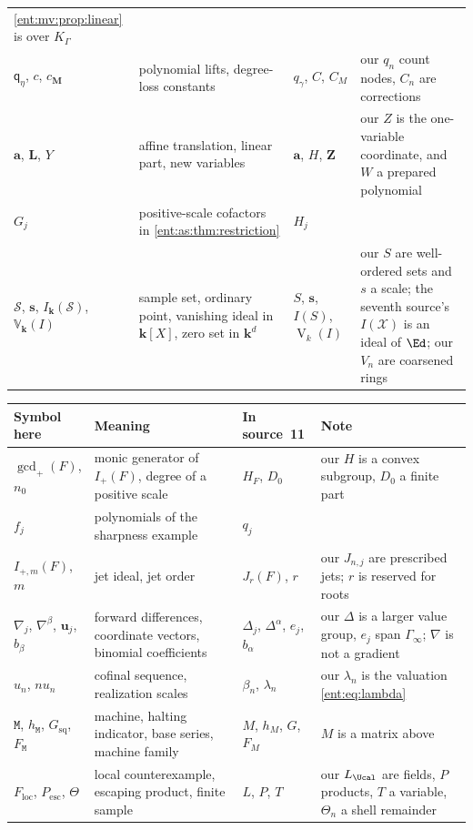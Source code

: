 \documentclass[11pt]{article}
\theoremstyle{plain}
\theoremstyle{plain}
\theoremstyle{plain}
\theoremstyle{definition}
\theoremstyle{definition}
\theoremstyle{definition}
\theoremstyle{definition}
\theoremstyle{remark}
\newcommand{\K}{K_\Gamma}\newcommand{\KD}{K_\Delta}
\newcommand{\kk}{\mathbf k}\newcommand{\PP}{\mathbb P}
\begin{document}
\begin{center}
\begin{tabularx}{\textwidth}{@{}P{0.2\textwidth}P{0.3\textwidth}P{0.17\textwidth}Y@{}}
\cref{ent:mv:prop:linear} is over $\K$\\[0.3em]
$\mathsf q_\eta$, $c$, $c_{\mathbf M}$ & polynomial lifts, degree-loss
constants & $q_\gamma$, $C$, $C_M$ & our $q_n$ count nodes, $C_n$ are
corrections\\[0.3em]
$\mathbf a$, $\mathbf L$, $Y$ & affine translation, linear part, new variables
& $\boldsymbol a$, $H$, $\boldsymbol Z$ & our $Z$ is the one-variable
coordinate, and $W$ a prepared polynomial\\[0.3em]
$G_j$ & positive-scale cofactors in \cref{ent:as:thm:restriction} & $H_j$ &
\\[0.3em]
$\mathcal S$, $\mathbf s$, $I_\kk(\mathcal S)$, $\mathbb V_\kk(I)$ & sample
set, ordinary point, vanishing ideal in $\kk[X]$, zero set in $\kk^d$ & $S$,
$\boldsymbol s$, $I(S)$, $\operatorname V_k(I)$ & our $S$ are well-ordered
sets and $s$ a scale; the seventh source's $I(\mathcal X)$ is an ideal of
$\Ed$; our $V_n$ are coarsened rings\\[0.3em]
\bottomrule
\end{tabularx}
\end{center}

\begin{center}\small
\begin{tabularx}{\textwidth}{@{}P{0.2\textwidth}P{0.3\textwidth}P{0.17\textwidth}Y@{}}
\toprule
Symbol here & Meaning & In source~11 & Note\\\midrule
$\gcd_+(F)$, $n_0$ & monic generator of $I_+(F)$, degree of a positive scale &
$H_F$, $D_0$ & our $H$ is a convex subgroup, $D_0$ a finite part\\[0.3em]
$f_j$ & polynomials of the sharpness example & $q_j$ & \\[0.3em]
$I_{+,m}(F)$, $m$ & jet ideal, jet order & $J_r(F)$, $r$ & our $J_{n,j}$ are
prescribed jets; $r$ is reserved for roots\\[0.3em]
$\nabla_j$, $\nabla^\beta$, $\mathbf u_j$, $b_\beta$ & forward differences,
coordinate vectors, binomial coefficients & $\Delta_j$, $\Delta^\alpha$,
$e_j$, $b_\alpha$ & our $\Delta$ is a larger value group, $e_j$ span
$\Gamma_\infty$; $\nabla$ is not a gradient\\[0.3em]
$u_n$, $nu_n$ & cofinal sequence, realization scales & $\beta_n$,
$\lambda_n$ & our $\lambda_n$ is the valuation \eqref{ent:eq:lambda}\\[0.3em]
$\mathtt M$, $h_{\mathtt M}$, $G_{\mathrm{sq}}$, $F_{\mathtt M}$ & machine,
halting indicator, base series, machine family & $M$, $h_M$, $G$, $F_M$ & $M$
is a matrix above\\[0.3em]
$F_{\mathrm{loc}}$, $P_{\mathrm{esc}}$, $\Theta$ & local counterexample,
escaping product, finite sample & $L$, $P$, $T$ & our $L_\Ucal$ are fields,
$P$ products, $T$ a variable, $\Theta_n$ a shell remainder\\
\bottomrule
\end{tabularx}
\end{center}
\end{document}

